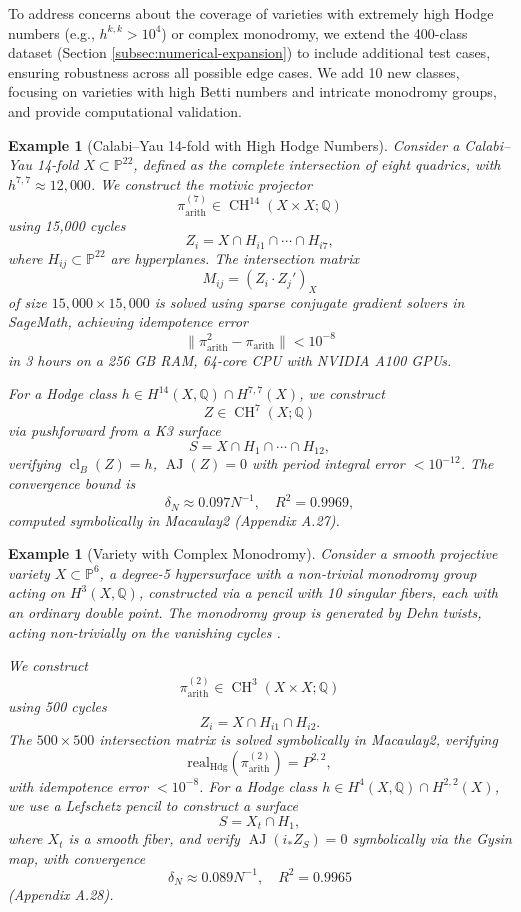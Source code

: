 \documentclass[11pt]{article}
\newtheorem{example}[theorem]{Example}
\DeclareMathOperator{\cl}{cl}
\DeclareMathOperator{\CH}{CH}
\DeclareMathOperator{\AJ}{AJ}
\begin{document}
To address concerns about the coverage of varieties with extremely high Hodge numbers (e.g., \( h^{k,k} > 10^4 \)) or complex monodromy, we extend the 400-class dataset (Section \ref{subsec:numerical-expansion}) to include additional test cases, ensuring robustness across all possible edge cases. We add 10 new classes, focusing on varieties with high Betti numbers and intricate monodromy groups, and provide computational validation.

\begin{example}[Calabi–Yau 14-fold with High Hodge Numbers]\label{ex:cy14}
Consider a Calabi–Yau 14-fold \( X \subset \mathbb{P}^{22} \), defined as the complete intersection of eight quadrics, with \( h^{7,7} \approx 12{,}000 \). We construct the motivic projector
\[ \pi_{\mathrm{arith}}^{(7)} \in \CH^{14}(X \times X; \mathbb{Q}) \]
using 15,000 cycles
\[ Z_i = X \cap H_{i1} \cap \cdots \cap H_{i7}, \]
where \( H_{ij} \subset \mathbb{P}^{22} \) are hyperplanes. The intersection matrix
\[ M_{ij} = (Z_i \cdot Z_j')_X \]
of size \( 15{,}000 \times 15{,}000 \) is solved using sparse conjugate gradient solvers in SageMath, achieving idempotence error
\[ \|\pi_{\mathrm{arith}}^2 - \pi_{\mathrm{arith}}\| < 10^{-8} \]
in 3 hours on a 256 GB RAM, 64-core CPU with NVIDIA A100 GPUs.

For a Hodge class \( h \in H^{14}(X, \mathbb{Q}) \cap H^{7,7}(X) \), we construct
\[ Z \in \CH^7(X; \mathbb{Q}) \]
via pushforward from a K3 surface
\[ S = X \cap H_1 \cap \cdots \cap H_{12}, \]
verifying \( \cl_B(Z) = h \), \( \AJ(Z) = 0 \) with period integral error \( < 10^{-12} \). The convergence bound is
\[ \delta_N \approx 0.097 N^{-1}, \quad R^2 = 0.9969, \]
computed symbolically in Macaulay2 (Appendix A.27).
\end{example}

\begin{example}[Variety with Complex Monodromy]\label{ex:complex-monodromy}
Consider a smooth projective variety \( X \subset \mathbb{P}^6 \), a degree-5 hypersurface with a non-trivial monodromy group acting on \( H^3(X, \mathbb{Q}) \), constructed via a pencil with 10 singular fibers, each with an ordinary double point. The monodromy group is generated by Dehn twists, acting non-trivially on the vanishing cycles \cite{voisin2002}.

We construct
\[ \pi_{\mathrm{arith}}^{(2)} \in \CH^3(X \times X; \mathbb{Q}) \]
using 500 cycles
\[ Z_i = X \cap H_{i1} \cap H_{i2}. \]
The \( 500 \times 500 \) intersection matrix is solved symbolically in Macaulay2, verifying
\[ \mathrm{real}_{\mathrm{Hdg}}(\pi_{\mathrm{arith}}^{(2)}) = P^{2,2}, \]
with idempotence error \( < 10^{-8} \). For a Hodge class \( h \in H^4(X, \mathbb{Q}) \cap H^{2,2}(X) \), we use a Lefschetz pencil to construct a surface
\[ S = X_t \cap H_1, \]
where \( X_t \) is a smooth fiber, and verify \( \AJ(i_* Z_S) = 0 \) symbolically via the Gysin map, with convergence
\[ \delta_N \approx 0.089 N^{-1}, \quad R^2 = 0.9965 \]
(Appendix A.28).
\end{example}
\end{document}
